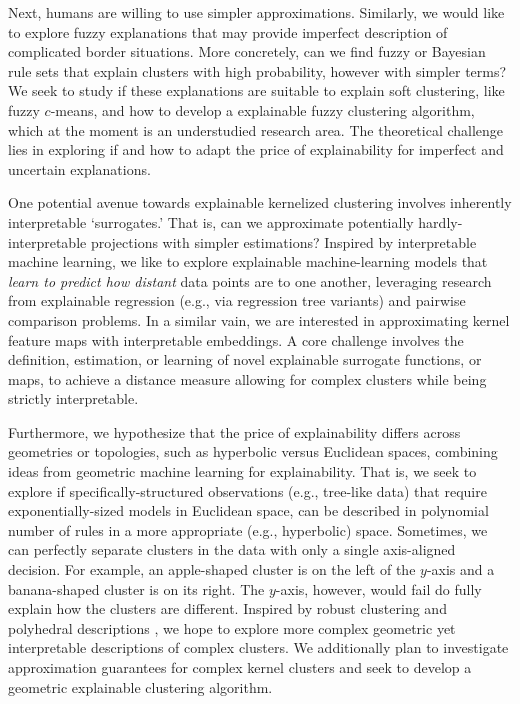 \documentclass[a4paper,11pt]{article}
\begin{document}
Next, humans are willing to use simpler approximations.
Similarly, we would like to explore fuzzy explanations 
that may provide imperfect description of complicated border situations.
More concretely, can we find fuzzy or Bayesian rule sets that explain clusters with high probability, 
however with simpler terms?
We seek to study if these explanations are suitable to explain soft clustering, 
like fuzzy $c$-means, and how to develop a \joint explainable fuzzy clustering algorithm, 
which at the moment is an understudied research area.
The theoretical challenge lies in exploring if and how to adapt the price of explainability 
for imperfect and uncertain explanations. 

One potential avenue towards explainable kernelized clustering involves inherently interpretable `surrogates.'
That is, can we approximate potentially hardly-interpretable projections with simpler estimations?
Inspired by interpretable machine learning, we like to explore explainable machine-learning models that 
\emph{learn to predict how distant} data points are to one another, 
leveraging research from explainable regression (e.g., via regression tree variants) and pairwise comparison problems.
In a similar vain, we are interested in approximating kernel feature maps with interpretable embeddings. 
A core challenge involves the definition, estimation, or learning of novel explainable surrogate functions, 
or maps, to achieve a distance measure allowing for complex clusters while being strictly interpretable.

Furthermore, we hypothesize that the price of explainability differs across geometries or topologies, 
such as hyperbolic versus Euclidean spaces, 
combining ideas from geometric machine learning for explainability. 
That is, we seek to explore if specifically-structured observations (e.g., tree-like data) 
that require exponentially-sized models in Euclidean space, 
can be described in polynomial number of rules in a more appropriate (e.g., hyperbolic) space.
Sometimes, we can perfectly separate clusters in the data with only a single axis-aligned decision.
For example, an apple-shaped cluster is on the left of the $y$-axis and a banana-shaped cluster is on its right. 
The $y$-axis, however, would fail do fully explain how the clusters are different.
Inspired by robust clustering and polyhedral descriptions \cite{lawless2023polyhedral},
we hope to explore more complex geometric yet interpretable descriptions of complex clusters.
We additionally plan to investigate approximation guarantees for complex kernel clusters and seek to develop a geometric explainable clustering algorithm.
\fi
\end{document}
